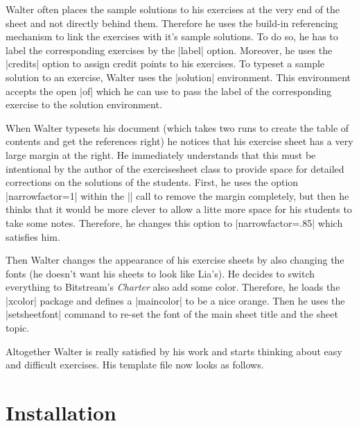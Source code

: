 \documentclass[a4paper,fleqn]{report}
\def\exercisesheet{{exercisesheet}}
\begin{document}
\noindent Walter often places the sample solutions to his exercises at
the very end of the sheet and not directly behind them. Therefore he
uses the build-in referencing mechanism to link the exercises with
it's sample solutions. To do so, he has to label the corresponding
exercises by the |label| option. Moreover, he uses the |credits|
option to assign credit points to his exercises. To typeset a sample
solution to an exercise, Walter uses the |solution| environment. This
environment accepts the open |of| which he can use to pass the label
of the corresponding exercise to the solution environment.



\noindent When Walter typesets his document (which takes two runs to
create the table of contents and get the references right) he notices
that his exercise sheet has a very large margin at the right. He
immediately understands that this must be intentional by the author of
the \exercisesheet{} class to provide space for detailed corrections
on the solutions of the students. First, he uses the option
|narrowfactor=1| within the |\sheetconf| call to remove the margin
completely, but then he thinks that it would be more clever to allow a
litte more space for his students to take some notes. Therefore, he
changes this option to |narrowfactor=.85| which satisfies him.



\noindent Then Walter changes the appearance of his exercise sheets by
also changing the fonts (he doesn't want his sheets to look like
Lia's). He decides to switch everything to Bitstream's \emph{Charter}
also add some color. Therefore, he loads the |xcolor| package and
defines a |maincolor| to be a nice orange. Then he uses the
|setsheetfont| command to re-set the font of the main sheet title and
the sheet topic.



\noindent Altogether Walter is really satisfied by his work and starts
thinking about easy and difficult exercises. His template file now
looks as follows.




\chapter{Installation}
\end{document}
